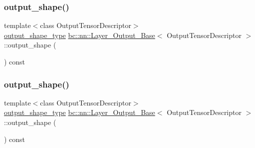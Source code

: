 \subsubsection{\texorpdfstring{output\+\_\+shape()}{output\_shape()}\hspace{0.1cm}{\footnotesize\ttfamily [1/2]}}
{\footnotesize\ttfamily template$<$class Output\+Tensor\+Descriptor$>$ \\
\hyperlink{structbc_1_1nn_1_1Layer__Output__Base_aa627047014ee5dff2b9cc1804c791815}{output\+\_\+shape\+\_\+type} \hyperlink{structbc_1_1nn_1_1Layer__Output__Base}{bc\+::nn\+::\+Layer\+\_\+\+Output\+\_\+\+Base}$<$ Output\+Tensor\+Descriptor $>$\+::output\+\_\+shape (\begin{DoxyParamCaption}{ }\end{DoxyParamCaption}) const\hspace{0.3cm}{\ttfamily [inline]}}

\mbox{\label{structbc_1_1nn_1_1Layer__Output__Base_a68e2547ad75da9ef3a3410a9aec85a5e}} 
\subsubsection{\texorpdfstring{output\+\_\+shape()}{output\_shape()}\hspace{0.1cm}{\footnotesize\ttfamily [2/2]}}
{\footnotesize\ttfamily template$<$class Output\+Tensor\+Descriptor$>$ \\
\hyperlink{structbc_1_1nn_1_1Layer__Output__Base_aa627047014ee5dff2b9cc1804c791815}{output\+\_\+shape\+\_\+type} \hyperlink{structbc_1_1nn_1_1Layer__Output__Base}{bc\+::nn\+::\+Layer\+\_\+\+Output\+\_\+\+Base}$<$ Output\+Tensor\+Descriptor $>$\+::output\+\_\+shape (\begin{DoxyParamCaption}{ }\end{DoxyParamCaption}) const\hspace{0.3cm}{\ttfamily [inline]}}

\mbox{\label{structbc_1_1nn_1_1Layer__Output__Base_a5a8d62346446d12d82153844b051e555}} 

